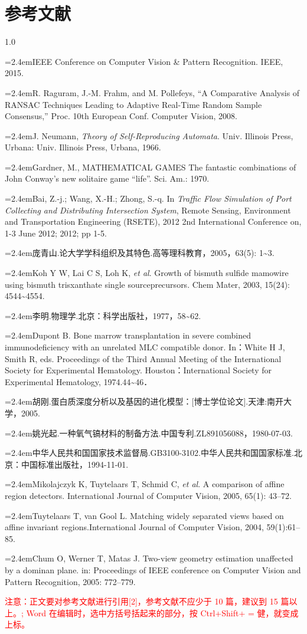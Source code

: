
\clearpage
{}
\chapter*{参考文献}

\begin{spacing}{1.0}
\zihaowu
\parindent 0pt
\newcommand{\NKTrefitem}[1]{\hangindent=2.4em\noindent #1\par}

\NKTrefitem{[1] IEEE Conference on Computer Vision \& Pattern Recognition. IEEE, 2015.}
\NKTrefitem{[2] R. Raguram, J.-M. Frahm, and M. Pollefeys, ``A Comparative Analysis of RANSAC Techniques Leading to Adaptive Real-Time Random Sample Consensus,'' Proc. 10th European Conf. Computer Vision, 2008.}
\NKTrefitem{[3] J. Neumann, \textit{Theory of Self-Reproducing Automata}. Univ. Illinois Press, Urbana: Univ. Illinois Press, Urbana, 1966.}
\NKTrefitem{[4] Gardner, M., MATHEMATICAL GAMES The fantastic combinations of John Conway's new solitaire game ``life''. Sci. Am.: 1970.}
\NKTrefitem{[5] Bai, Z.-j.; Wang, X.-H.; Zhong, S.-q. In \textit{Traffic Flow Simulation of Port Collecting and Distributing Intersection System}, Remote Sensing, Environment and Transportation Engineering (RSETE), 2012 2nd International Conference on, 1-3 June 2012; 2012; pp 1-5.}
\NKTrefitem{[6] 庞青山.论大学学科组织及其特色.高等理科教育，2005，63(5): 1\textasciitilde3.}
\NKTrefitem{[7] Koh Y W, Lai C S, Loh K, \textit{et al}. Growth of bismuth sulfide mamowire using bismuth trisxanthate single sourceprecursors. Chem Mater, 2003, 15(24): 4544\textasciitilde4554.}
\NKTrefitem{[8] 李明.物理学.北京：科学出版社，1977，58\textasciitilde62.}
\NKTrefitem{[9] Dupont B. Bone marrow transplantation in severe combined immunodeficiency with an unrelated MLC compatible donor. In：White H J, Smith R, eds. Proceedings of the Third Annual Meeting of the International Society for Experimental Hematology. Houston：International Society for Experimental Hematology, 1974.44\textasciitilde46．}
\NKTrefitem{[10] 胡\hspace{0.5em}刚.蛋白质深度分析以及基因的进化模型：[博士学位论文].天津:南开大学，2005.}
\NKTrefitem{[11] 姚光起.一种氧气镐材料的制备方法.中国专利.ZL891056088，1980-07-03.}
\NKTrefitem{[12] 中华人民共和国国家技术监督局.GB3100-3102.中华人民共和国国家标准.北京：中国标准出版社，1994-11-01.}

\newpage

\NKTrefitem{[13] Mikolajczyk K, Tuytelaars T, Schmid C, \textit{et al}. A comparison of affine region detectors. International Journal of Computer Vision, 2005, 65(1): 43--72.}
\NKTrefitem{[14] Tuytelaars T, van Gool L. Matching widely separated views based on affine invariant regions.International Journal of Computer Vision, 2004, 59(1):61--85.}
\NKTrefitem{[15] Chum O, Werner T, Matas J. Two-view geometry estimation unaffected by a dominan plane. in: Proceedings of IEEE conference on Computer Vision and Pattern Recognition, 2005: 772--779.}

\vspace{\baselineskip}
\textcolor{red}{注意：正文要对参考文献进行引用[2]，参考文献不应少于 10 篇，建议到 15 篇以上。; Word 在编辑时，选中方括号括起来的部分，按 Ctrl+Shift+ = 健，就变成上标。}
\end{spacing}

